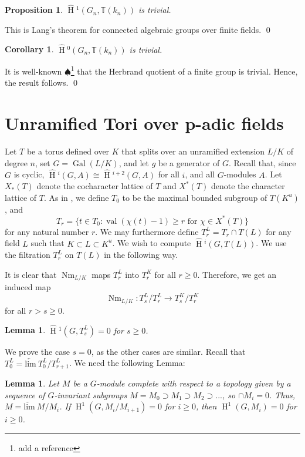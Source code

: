 \documentclass[11pt]{amsart}
\theoremstyle{plain}
\newtheorem{proposition}[theorem]{Proposition}
\newtheorem{corollary}[theorem]{Corollary}
\newtheorem{lemma}[theorem]{Lemma}
\newcommand{\DRxxx}[1]{$\spadesuit$\footnote{#1}}
\newcommand{\HT}[1]{\hat{\HH}{}^{#1}}
\theoremstyle{definition}
\DeclareMathOperator{\Gal}{Gal}
\DeclareMathOperator{\val}{val}
\DeclareMathOperator{\HH}{H}
\DeclareMathOperator{\Nm}{Nm}
\begin{document}
\begin{proposition}\label{trivialH1finitefields}
$\HT{1}(G_n,\mathbb{T}(k_n))$ is trivial.
\end{proposition}

\proof
This is Lang's theorem for connected algebraic groups over finite fields.
\qed

\begin{corollary}
$\HT{0}(G_n,\mathbb{T}(k_n))$ is trivial.
\end{corollary}

\proof
It is well-known
\DRxxx{add a reference}
that the Herbrand quotient of a finite group is trivial.  Hence, the result follows.
\qed

\section{Unramified Tori over p-adic fields}

Let $T$ be a torus defined over $K$ that splits over an unramified
extension $L/K$ of degree $n$, set $G = \Gal(L/K)$, and let $g$ be a
generator of $G$.  Recall that, since $G$ is cyclic,
$\HT{i}(G,A)\cong \HT{i+2}(G,A)$ for all $i$, and all
$G$-modules $A$.  Let $X_*(T)$ denote the cocharacter lattice of $T$ and
$X^*(T)$ denote the character lattice of $T$.  As in \cite[Section 3]{moyprasad1},
we define $T_0$ to be the maximal bounded subgroup of
$T(K^u)$, and
$$T_r = \{t \in T_0 : \val(\chi(t) - 1) \geq r \mbox{ for } \chi \in X^*(T) \}$$
for any natural number $r$.  We may
furthermore define $T_r^L = T_r \cap T(L)$ for any field $L$ such
that $K \subset L \subset K^u$.  We wish to compute $\HT{i}(G, T(L))$.
We use the filtration $T_r^L$ on $T(L)$ in the following way.

It is clear that $\Nm_{L/K}$ maps $T_r^L$ into $T_r^K$ for all $r \geq 0$.
Therefore, we get an induced map
$$\Nm_{L/K} : T_s^L / T_{r}^L \rightarrow T_s^K / T_{r}^K$$
for all $r > s \geq 0$.

\begin{lemma}\label{H1compactpart}
$\HT{1}(G, T_{s}^L) = 0$ for $s \geq 0$.
\end{lemma}

\proof
We prove the case $s = 0$, as the other cases are similar.  Recall
that $T_0^L = \underleftarrow{\mathrm{lim}} \ T_0^L / T_{r+1}^L$.  We
need the following Lemma:

\begin{lemma}\label{abstractcohomology}
  Let $M$ be a $G$-module complete with respect to a topology given by
  a sequence of $G$-invariant subgroups $M = M_0 \supset M_1 \supset
  M_2 \supset ...$, so $\cap M_i = 0$.  Thus,
  $M = \underleftarrow{\mathrm{lim}} \ M / M_i$.
  If $\HH^1(G, M_i / M_{i+1}) = 0$ for $i \geq 0$,
  then $\HH^1(G, M_i) = 0$ for $i \geq 0$.
\end{lemma}
\end{document}
